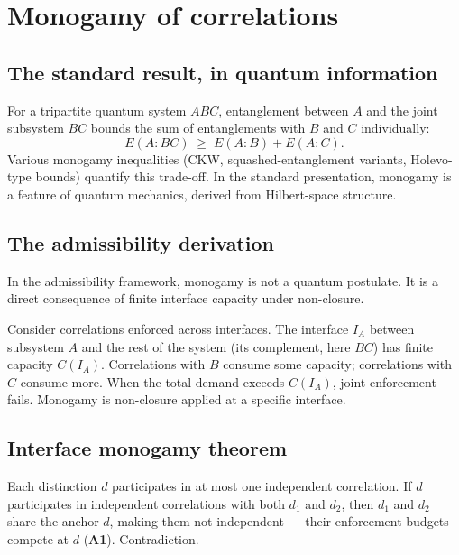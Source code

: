 \documentclass[11pt]{article}
\newcommand{\epitag}[1]{\textbf{[#1]}}
\newcommand{\Aone}{\textbf{A1}}
\theoremstyle{definition}
\begin{document}
\clearpage

\section{Monogamy of correlations}\label{sec:monogamy}

\subsection{The standard result, in quantum information}\label{sec:monogamy_standard}

For a tripartite quantum system $ABC$, entanglement between $A$ and the joint subsystem $BC$ bounds the sum of entanglements with $B$ and $C$ individually:
\[
E(A : BC) \;\geq\; E(A : B) + E(A : C).
\]
Various monogamy inequalities (CKW, squashed-entanglement variants, Holevo-type bounds) quantify this trade-off. In the standard presentation, monogamy is a feature of quantum mechanics, derived from Hilbert-space structure.

\subsection{The admissibility derivation}\label{sec:monogamy_admissibility}

In the admissibility framework, monogamy is not a quantum postulate. It is a direct consequence of finite interface capacity under non-closure.

Consider correlations enforced across interfaces. The interface $I_A$ between subsystem $A$ and the rest of the system (its complement, here $BC$) has finite capacity $C(I_A)$. Correlations with $B$ consume some capacity; correlations with $C$ consume more. When the total demand exceeds $C(I_A)$, joint enforcement fails. Monogamy is non-closure applied at a specific interface.

\subsection{Interface monogamy theorem}\label{sec:TM}

\begin{tcolorbox}[apfbox, title={Theorem $T_M$ (Interface Monogamy) \epitag{P}}]
Each distinction $d$ participates in at most one independent correlation. If $d$ participates in independent correlations with both $d_1$ and $d_2$, then $d_1$ and $d_2$ share the anchor $d$, making them not independent --- their enforcement budgets compete at $d$ (\Aone{}). Contradiction.
\end{tcolorbox}
\end{document}
